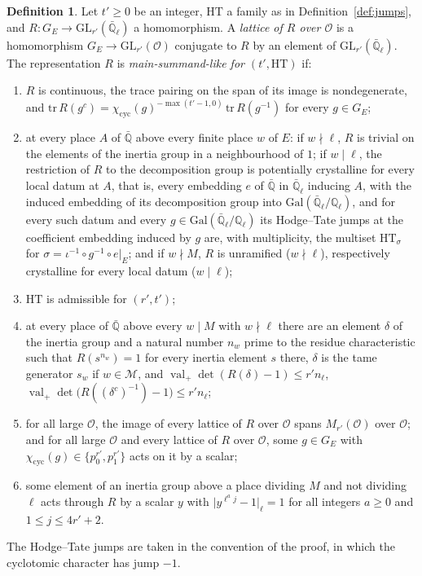 \documentclass[reqno]{amsart}
\theoremstyle{definition}
\newtheorem{definition}{Definition}[section]
\theoremstyle{plain}
\newcommand{\Q}{\mathbb{Q}}
\newcommand{\Oc}{\mathcal{O}}
\newcommand{\GL}{\mathrm{GL}}
\newcommand{\cyc}{\chi_{\mathrm{cyc}}}
\newcommand{\val}{\operatorname{val}}
\newcommand{\HT}{\mathrm{HT}}
\begin{document}
\begin{definition}\label{def:main-summand-like}
Let \(t' \ge 0\) be an integer, \(\HT\) a family as in Definition~\ref{def:jumps}, and \(R \colon G_E \to \GL_{r'}(\bar{\Q}_\ell)\) a homomorphism.  A \emph{lattice of \(R\) over \(\Oc\)} is a homomorphism \(G_E \to \GL_{r'}(\Oc)\) conjugate to \(R\) by an element of \(\GL_{r'}(\bar{\Q}_\ell)\).  The representation \(R\) is \emph{main-summand-like for \((t', \HT)\)} if:
\begin{enumerate}
\item[(a)] \(R\) is continuous, the trace pairing on the span of its image is nondegenerate, and \(\mathrm{tr}\,R(g^c) = \cyc(g)^{-\max(t'-1,0)}\,\mathrm{tr}\,R(g^{-1})\) for every \(g \in G_E\);
\item[(b)] at every place \(A\) of \(\bar{\Q}\) above every finite place \(w\) of \(E\): if \(w \nmid \ell\), \(R\) is trivial on the elements of the inertia group in a neighbourhood of \(1\); if \(w \mid \ell\), the restriction of \(R\) to the decomposition group is potentially crystalline for every local datum at \(A\), that is, every embedding \(e\) of \(\bar{\Q}\) in \(\bar{\Q}_\ell\) inducing \(A\), with the induced embedding of its decomposition group into \(\mathrm{Gal}(\bar{\Q}_\ell/\Q_\ell)\), and for every such datum and every \(g \in \mathrm{Gal}(\bar{\Q}_\ell/\Q_\ell)\) its Hodge--Tate jumps at the coefficient embedding induced by \(g\) are, with multiplicity, the multiset \(\HT_\sigma\) for \(\sigma = \iota^{-1}\circ g^{-1}\circ e|_E\); and if \(w \nmid M\), \(R\) is unramified (\(w \nmid \ell\)), respectively crystalline for every local datum (\(w \mid \ell\));
\item[(c)] \(\HT\) is admissible for \((r', t')\);
\item[(d)] at every place of \(\bar{\Q}\) above every \(w \mid M\) with \(w \nmid \ell\) there are an element \(\delta\) of the inertia group and a natural number \(n_w\) prime to the residue characteristic such that \(R(s^{n_w}) = 1\) for every inertia element \(s\) there, \(\delta\) is the tame generator \(s_w\) if \(w \in \mathcal M\), and
\(\val_+\det(R(\delta) - 1) \le r'n_\ell\), \(\val_+\det\bigl(R((\delta^c)^{-1}) - 1\bigr) \le r'n_\ell\);
\item[(e)] for all large \(\Oc\), the image of every lattice of \(R\) over \(\Oc\) spans \(M_{r'}(\Oc)\) over \(\Oc\); and for all large \(\Oc\) and every lattice of \(R\) over \(\Oc\), some \(g \in G_E\) with \(\cyc(g) \in \{p_0^{r'}, p_1^{r'}\}\) acts on it by a scalar;
\item[(f)] some element of an inertia group above a place dividing \(M\) and not dividing \(\ell\) acts through \(R\) by a scalar \(y\) with \(\lvert y^{\ell^a j} - 1\rvert_\ell = 1\) for all integers \(a \ge 0\) and \(1 \le j \le 4r' + 2\).
\end{enumerate}
The Hodge--Tate jumps are taken in the convention of the proof, in which the cyclotomic character has jump \(-1\).
\end{definition}
\end{document}
